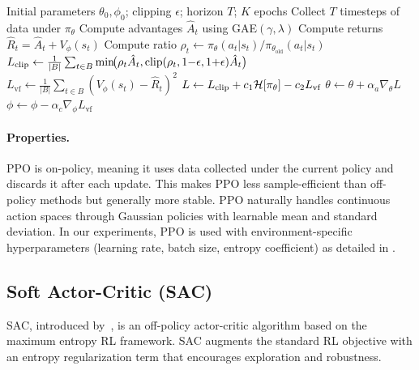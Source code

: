 \begin{algorithm}[htbp]
\caption{Proximal Policy Optimization (PPO)}
\label{alg:ppo}
\begin{algorithmic}[1]
\Require Initial parameters $\theta_0, \phi_0$; clipping $\epsilon$; horizon $T$; $K$ epochs
    \State Collect $T$ timesteps of data under $\pi_\theta$
    \State Compute advantages $\hat{A}_t$ using GAE$(\gamma, \lambda)$
    \State Compute returns $\hat{R}_t = \hat{A}_t + V_\phi(s_t)$
            \State Compute ratio $\rho_t \gets \pi_\theta(a_t|s_t) / \pi_{\theta_{\text{old}}}(a_t|s_t)$
            \State $L_{\text{clip}} \gets \frac{1}{|B|} \sum_{t \in B} \min\!\bigl(\rho_t \hat{A}_t, \operatorname{clip}(\rho_t, 1{-}\epsilon, 1{+}\epsilon) \hat{A}_t\bigr)$
            \State $L_{\text{vf}} \gets \frac{1}{|B|} \sum_{t \in B} (V_\phi(s_t) - \hat{R}_t)^2$
            \State $L \gets L_{\text{clip}} + c_1 \mathcal{H}[\pi_\theta] - c_2 L_{\text{vf}}$
            \State $\theta \gets \theta + \alpha_a \nabla_\theta L$
            \State $\phi \gets \phi - \alpha_c \nabla_\phi L_{\text{vf}}$
        \EndFor
    \EndFor
\EndFor
\end{algorithmic}
\end{algorithm}

\paragraph{Properties.} PPO is on-policy, meaning it uses data collected under the current policy and discards it after each update. This makes PPO less sample-efficient than off-policy methods but generally more stable. PPO naturally handles continuous action spaces through Gaussian policies with learnable mean and standard deviation. In our experiments, PPO is used with environment-specific hyperparameters (learning rate, batch size, entropy coefficient) as detailed in .

\subsection{Soft Actor-Critic (SAC)}
\label{sec:sac}

SAC, introduced by~\citet{haarnoja2018sac}, is an off-policy actor-critic algorithm based on the maximum entropy RL framework. SAC augments the standard RL objective with an entropy regularization term that encourages exploration and robustness.

